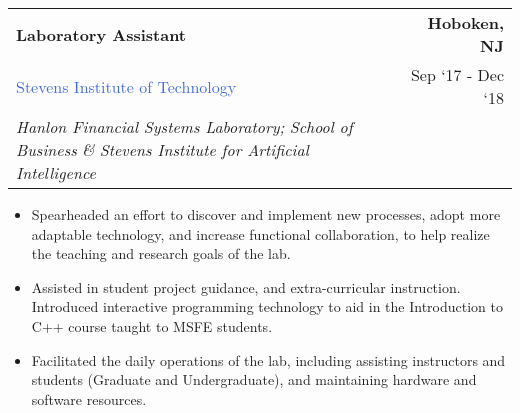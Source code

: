 \documentclass[10pt]{article}
\newcommand{\highlightcolor}{RoyalBlue}
\newcommand{\tabularxwidth}{\textwidth}
\begin{document}
    \begin{minipage}{\tabularxwidth}

        \begin{tabularx}{\tabularxwidth}{X r}
            \textbf{Laboratory Assistant} & \textbf{Hoboken, 
        NJ} \\
            
    
    
    
    

    
        \textcolor{\highlightcolor}{Stevens Institute of Technology} & 
        
    Sep ‘17 - 
    Dec ‘18 \\
        
            \textit{Hanlon Financial Systems Laboratory;}
                \textit{School of Business} \textit{\&}
                \textit{Stevens Institute for Artificial Intelligence} & \\
        
    
            
        \end{tabularx}

        \begin{itemize}[noitemsep, topsep=3pt, parsep=0pt, partopsep=0pt]
            
                \item 
    Spearheaded an effort to discover and implement new processes, adopt more adaptable technology, and increase functional collaboration, to help realize the teaching and research goals of the lab.
            
                \item 
    Assisted in student project guidance, and extra-curricular instruction. Introduced interactive programming technology to aid in the Introduction to C++ course taught to MSFE students.
            
                \item 
    Facilitated the daily operations of the lab, including assisting instructors and students (Graduate and Undergraduate), and maintaining hardware and software resources.
            
        \end{itemize}

        

    \end{minipage}
    
\end{document}
